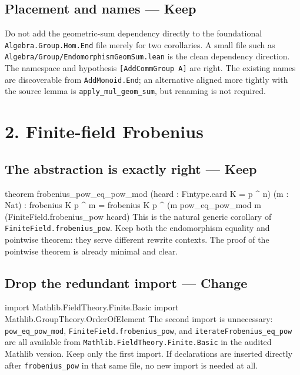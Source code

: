 \documentclass[10pt]{article}
\newenvironment{lean}{\Verbatim[fontsize=\scriptsize,frame=single,framesep=1.5mm,formatcom=\leanfont]}{\endVerbatim}
\newcommand{\high}{\textcolor{hi}{\textbf{Change}}}
\newcommand{\keep}{\textbf{Keep}}
\begin{document}
\subsection*{Placement and names --- \keep}
Do not add the geometric-sum dependency directly to the foundational
\texttt{Algebra.Group.Hom.End} file merely for two corollaries. A small file such as
\texttt{Algebra/Group/EndomorphismGeomSum.lean} is the clean dependency direction. The namespace and
hypothesis \texttt{[AddCommGroup A]} are right. The existing names are discoverable from
\texttt{AddMonoid.End}; an alternative aligned more tightly with the source lemma is
\texttt{apply\_mul\_geom\_sum}, but renaming is not required.

\begin{center}
\end{center}

\newpage
\section*{2. Finite-field Frobenius}
\subsection*{The abstraction is exactly right --- \keep}
\begin{lean}
theorem frobenius_pow_eq_pow_mod
    (hcard : Fintype.card K = p ^ n) (m : Nat) :
    frobenius K p ^ m = frobenius K p ^ (m %
  pow_eq_pow_mod m (FiniteField.frobenius_pow hcard)
\end{lean}
This is the natural generic corollary of \texttt{FiniteField.frobenius\_pow}. Keep both the
endomorphism equality and pointwise theorem: they serve different rewrite contexts. The proof of the
pointwise theorem is already minimal and clear.

\subsection*{Drop the redundant import --- \high}
\begin{lean}
import Mathlib.FieldTheory.Finite.Basic
import Mathlib.GroupTheory.OrderOfElement
\end{lean}
The second import is unnecessary: \texttt{pow\_eq\_pow\_mod},
\texttt{FiniteField.frobenius\_pow}, and \texttt{iterateFrobenius\_eq\_pow} are all available from
\texttt{Mathlib.FieldTheory.Finite.Basic} in the audited Mathlib version. Keep only the first import.
If declarations are inserted directly after \texttt{frobenius\_pow} in that same file, no new import
is needed at all.
\end{document}
